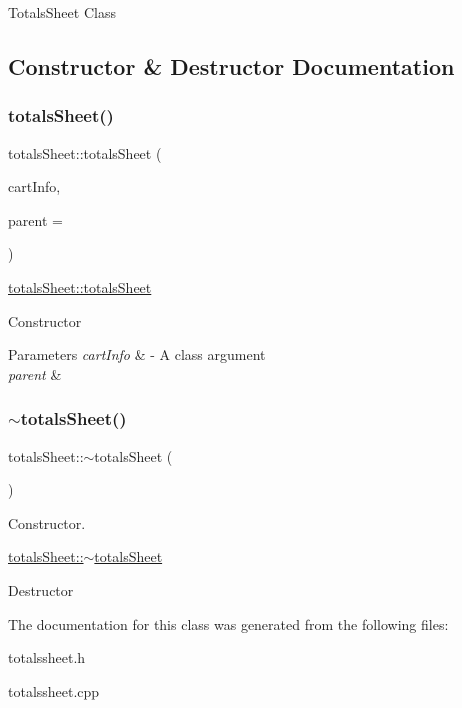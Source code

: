 Totals\+Sheet Class 

\subsection{Constructor \& Destructor Documentation}
\mbox{\label{classtotals_sheet_ab5b948f0b74c26fd822be62606d6ac35}} 
\subsubsection{\texorpdfstring{totals\+Sheet()}{totalsSheet()}}
{\footnotesize\ttfamily totals\+Sheet\+::totals\+Sheet (\begin{DoxyParamCaption}\item[{\mbox{\hyperlink{class_cart}{Cart}}}]{cart\+Info,  }\item[{Q\+Widget $\ast$}]{parent = {} }\end{DoxyParamCaption})\hspace{0.3cm}{\ttfamily [explicit]}}



\mbox{\hyperlink{classtotals_sheet_ab5b948f0b74c26fd822be62606d6ac35}{totals\+Sheet\+::totals\+Sheet}} 

Constructor 
\begin{DoxyParams}{Parameters}
{\em cart\+Info} & -\/ A class argument \\
\hline
{\em parent} & \\
\hline
\end{DoxyParams}
\mbox{\label{classtotals_sheet_a77d2ff4b0e0f02a4c05fbfa74bc6df84}} 
\subsubsection{\texorpdfstring{$\sim$totals\+Sheet()}{~totalsSheet()}}
{\footnotesize\ttfamily totals\+Sheet\+::$\sim$totals\+Sheet (\begin{DoxyParamCaption}{ }\end{DoxyParamCaption})}



Constructor. 

\mbox{\hyperlink{classtotals_sheet_a77d2ff4b0e0f02a4c05fbfa74bc6df84}{totals\+Sheet\+::$\sim$totals\+Sheet}}

Destructor 

The documentation for this class was generated from the following files\+:\begin{DoxyCompactItemize}
\item 
totalssheet.\+h\item 
totalssheet.\+cpp\end{DoxyCompactItemize}
